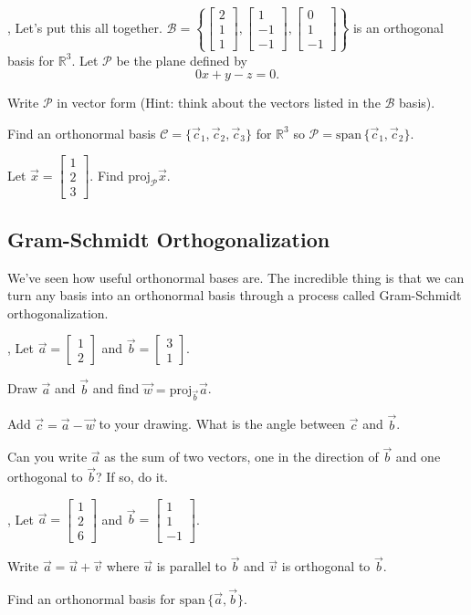\documentclass[letter]{article}
\newcommand{\R}{\mathbb{R}}
\newcommand{\proj}{\mathrm{proj}}
\renewcommand{\span}{\mathrm{span}\,}
\newcommand{\mat}[1]{\begin{bmatrix}#1\end{bmatrix}}
\begin{document}
	\sep
	Let's put this all together.  
	$\mathcal B=\left\{\mat{2\\1\\1},\mat{1\\-1\\-1},\mat{0\\1\\-1}\right\}$ is an
	orthogonal basis for $\R^3$.  Let $\mathcal P$ be the plane defined
	by
	\[
		0x+y-z=0.
	\]
	\begin{Enum}
		\item Write $\mathcal P$ in vector form (Hint: think about the vectors
			listed in the $\mathcal B$ basis).
		\item Find an orthonormal basis $\mathcal C=\{\vec c_1,\vec c_2,\vec c_3\}$
			for $\R^3$ so $\mathcal P=\span\{\vec c_1,\vec c_2\}$.
		\item Let $\vec x=\mat{1\\2\\3}$.  Find $\proj_{\mathcal P}\vec x$.
	\end{Enum}

\subsection*{Gram-Schmidt Orthogonalization}
	We've seen how useful orthonormal bases are.  The incredible thing is that we can 
	turn any basis into an orthonormal basis through a process called
	Gram-Schmidt orthogonalization.

	\sep
	Let $\vec a=\mat{1\\2}$ and $\vec b=\mat{3\\1}$.
	\begin{Enum}
		\item Draw $\vec a$ and $\vec b$ and find $\vec w=\proj_{\vec b}\vec a$.
		\item Add $\vec c=\vec a-\vec w$ to your drawing.  What is the angle between
			$\vec c$ and $\vec b$.
		\item Can you write $\vec a$ as the sum of two vectors, one in 
			the direction of $\vec b$ and one orthogonal to $\vec b$?
			If so, do it.
	\end{Enum}

	\sep
	Let $\vec a=\mat{1\\2\\6}$ and $\vec b=\mat{1\\1\\-1}$.
	\begin{Enum}
		\item Write $\vec a=\vec u+\vec v$ where $\vec u$ is parallel to
			$\vec b$ and $\vec v$ is orthogonal to $\vec b$.
		\item Find an orthonormal basis for $\span\{\vec a,\vec b\}$.
	\end{Enum}
\end{document}
